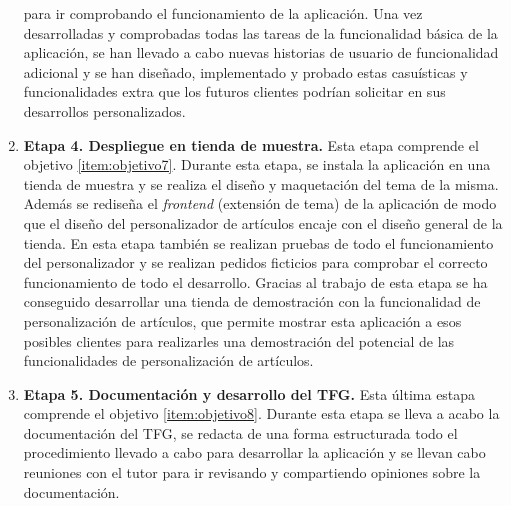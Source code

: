 \documentclass[11pt]{article}
\begin{document}
\begin{enumerate}[label={\textbf{\textbullet}}]
    para ir comprobando el funcionamiento de la aplicación. Una vez desarrolladas y comprobadas todas las tareas de la funcionalidad básica de la aplicación, se han llevado a cabo nuevas historias de usuario de funcionalidad adicional y se han diseñado, implementado y probado estas casuísticas y funcionalidades
    extra que los futuros clientes podrían solicitar en sus desarrollos personalizados.
    \item \textbf{Etapa 4. Despliegue en tienda de muestra.} Esta etapa comprende el objetivo \ref{item:objetivo7}. 
    Durante esta etapa, se instala la aplicación en una tienda de muestra y se realiza el diseño y maquetación del tema de la misma. Además se rediseña el \textit{frontend} (extensión de tema) de la aplicación de modo que el diseño del personalizador de artículos
    encaje con el diseño general de la tienda. En esta etapa también se realizan pruebas de todo el funcionamiento del personalizador y se realizan pedidos ficticios para comprobar el correcto
    funcionamiento de todo el desarrollo. Gracias al trabajo de esta etapa se ha conseguido desarrollar una tienda de demostración con la funcionalidad de personalización de artículos, que permite
    mostrar esta aplicación a esos posibles clientes para realizarles una demostración del potencial de las funcionalidades de personalización de artículos.
    \item \textbf{Etapa 5. Documentación y desarrollo del TFG.} Esta última estapa comprende el objetivo \ref{item:objetivo8}. Durante esta etapa
    se lleva a acabo la documentación del TFG, se redacta de una forma estructurada todo el procedimiento llevado a cabo para desarrollar
    la aplicación y se llevan cabo reuniones con el tutor para ir revisando y compartiendo opiniones sobre la documentación.
\end{enumerate}
\end{document}
